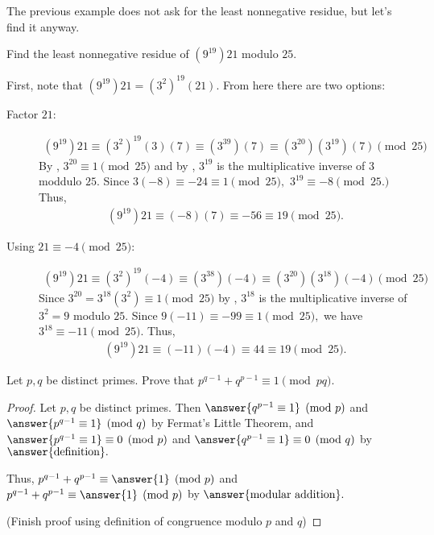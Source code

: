 \documentclass[letterpaper, 11 pt]{ximera}
\begin{document}
The previous example does not ask for the least nonnegative residue, but let's find it anyway.

\begin{example}
  Find the least nonnegative residue of $(9^{19})21$ modulo $25$.

  First, note that $(9^{19})21=(3^2)^19(21)$. From here there are two options:

  \begin{description}
    \item[Factor $21$:]
      \begin{align*}
        (9^{19})21\equiv (3^2)^19(3)(7)
        \equiv (3^{39})(7)
        \equiv (3^{20})(3^{19})(7) \pmod{25}
      \end{align*}
      By , $3^{20}\equiv 1\pmod{25}$ and by , $3^{19}$ is the multiplicative inverse of $3$ moddulo $25.$ Since $3(-8)\equiv -24\equiv 1\pmod{25},$ $3^{19}\equiv -8\pmod{25.}$ Thus, 
      \begin{align*}
        (9^{19})21\equiv (-8)(7)\equiv -56\equiv 19 \pmod{25}.
      \end{align*}

    \item[Using $21\equiv -4\pmod{25}$:] 
      \begin{align*}
        (9^{19})21\equiv (3^2)^19(-4)
        \equiv (3^{38})(-4)
        \equiv (3^{20})(3^{18})(-4) \pmod{25}
      \end{align*}
      Since $3^{20}=3^{18}(3^2)\equiv 1\pmod{25}$ by , $3^{18}$ is the multiplicative inverse of $3^2=9$ modulo $25.$ Since $9(-11)\equiv -99\equiv 1\pmod{25},$ we have $3^{18}\equiv -11\pmod{25}.$ Thus, 
      \begin{align*}
        (9^{19})21\equiv (-11)(-4)\equiv 44 \equiv 19 \pmod{25}.
      \end{align*}
  \end{description}
  
\end{example}

\begin{br}\label{br:modpq}
  Let $p,q$ be distinct primes. Prove that $p^{q-1}+q^{p-1}\equiv 1 \pmod{pq}.$
 
 
  \begin{proof} Let $p,q$ be distinct primes. 
   Then $\answer{q^{p-1}\equiv 1}\pmod{p}$ and  $\answer{p^{q-1}\equiv 1}\pmod{q}$ by Fermat's Little Theorem, and $\answer{p^{q-1}\equiv 1}\equiv0\pmod{p}$ and  $\answer{q^{p-1}\equiv 1}\equiv 0\pmod{q}$ by $\answer{\textnormal{definition}}.$
   
   Thus, $p^{q-1}+q^{p-1}\equiv \answer{1} \pmod{p}$ and $p^{q-1}+q^{p-1}\equiv \answer{1} \pmod{p}$ by $\answer{\textnormal{modular addition}}.$

   (Finish proof using definition of congruence modulo $p$ and $q$)
  \end{proof}
\end{br}
\end{document}
